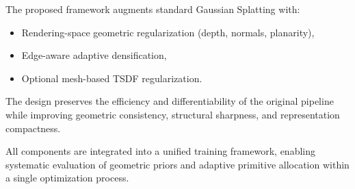 The proposed framework augments standard Gaussian Splatting with:

\begin{itemize}
    \item Rendering-space geometric regularization (depth, normals, planarity),
    \item Edge-aware adaptive densification,
    \item Optional mesh-based TSDF regularization.
\end{itemize}

The design preserves the efficiency and differentiability of the original pipeline while improving geometric consistency, structural sharpness, and representation compactness.

All components are integrated into a unified training framework, enabling systematic evaluation of geometric priors and adaptive primitive allocation within a single optimization process.
